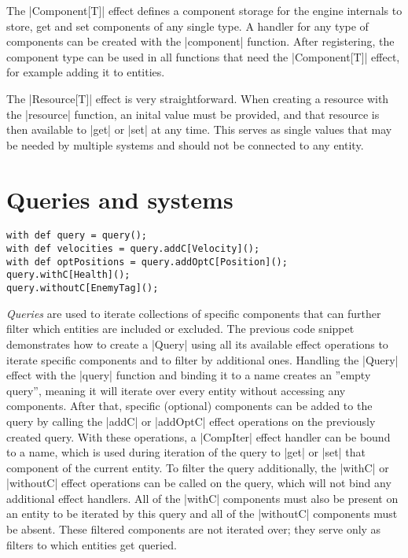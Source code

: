 The |Component[T]| effect defines a component storage for the engine internals to store, get and set components of any single type. A handler for any type of components can be created with the |component| function. After registering, the component type can be used in all functions that need the |Component[T]| effect, for example adding it to entities.

The |Resource[T]| effect is very straightforward. When creating a resource with the |resource| function, an inital value must be provided, and that resource is then available to |get| or |set| at any time. This serves as single values that may be needed by multiple systems and should not be connected to any entity.

\section{Queries and systems}

\begin{lstlisting}[caption=Query creation example]
with def query = query();
with def velocities = query.addC[Velocity]();
with def optPositions = query.addOptC[Position]();
query.withC[Health]();
query.withoutC[EnemyTag]();
\end{lstlisting}

\textit{Queries} are used to iterate collections of specific components that can further filter which entities are included or excluded. The previous code snippet demonstrates how to create a |Query| using all its available effect operations to iterate specific components and to filter by additional ones. Handling the |Query| effect with the |query| function and binding it to a name creates an ''empty query'', meaning it will iterate over every entity without accessing any components. After that, specific (optional) components can be added to the query by calling the |addC| or |addOptC| effect operations on the previously created query. With these operations, a |CompIter| effect handler can be bound to a name, which is used during iteration of the query to |get| or |set| that component of the current entity. To filter the query additionally, the |withC| or |withoutC| effect operations can be called on the query, which will not bind any additional effect handlers. All of the |withC| components must also be present on an entity to be iterated by this query and all of the |withoutC| components must be absent. These filtered components are not iterated over; they serve only as filters to which entities get queried.

